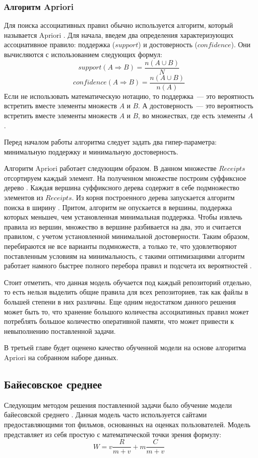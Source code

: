         \subsubsection{Алгоритм Apriori}
Для поиска ассоциативных правил обычно используется алгоритм, который называется Apriori \cite{apriori}. Для начала, введем два определения характеризующих ассоциативное правило: поддержка ($support$) и достоверность ($confidence$). Они вычисляются с использованием следующих формул:
    $$support(A \Rightarrow B) = \frac{n(A \cup B)}{N}$$
    $$confidence(A \Rightarrow B) = \frac{n(A \cup B)}{n(A)}$$
Если не использовать математическую нотацию, то поддержка~--- это вероятность встретить вместе элементы множеств $A$ и $B$. А достоверность~--- это вероятность встретить вместе элементы множеств $A$ и $B$, во множествах, где есть элементы $A$.

Перед началом работы алгоритма следует задать два гипер-параметра: минимальную поддержку и минимальную достоверность. 

Алгоритм Apriori работает следующим образом. В данном множестве $Receipts$ отсортируем каждый элемент. На полученном множестве построим суффиксное дерево \cite{trie}. Каждая вершина суффиксного дерева содержит в себе подмножество элементов из $Receipts$. Из корня построенного дерева запускается алгоритм поиска в ширину \cite{alghorithms}. Притом, алгоритм не опускается в вершины, поддержка которых меньшеч, чем установленная минимальная поддержка. Чтобы извлечь правила из вершин, множество в вершине разбивается на два, это и считается правилом, с учетом установленной минимальной достоверности. Таким образом, перебираются не все варианты подмножеств, а только те, что удовлетворяют поставленным условиям на минимальность, с такими оптимизациями алгоритм работает намного быстрее полного перебора правил и подсчета их вероятностей \cite{apriori}. 

Стоит отметить, что данная модель обучается под каждый репозиторий отдельно, то есть нельзя выделить общие правила для всех репозиториев, так как файлы в большей степени в них различны. Еще одним недостатком данного решения может быть то, что хранение большого количества ассоциативных правил может потреблять большое количество оперативной памяти, что может привести к невыполнению поставленной задачи.

В третьей главе будет оценено качество обученной модели на основе алгоритма Apriori на собранном наборе данных.
    \subsection{Байесовское среднее}\label{chapter-2-bayes}
Следующим методом решения поставленной задачи было обучение модели байесовской среднего \cite{bayesian-average}. Данная модель часто используется сайтами предоставляющими топ фильмов, основанных на оценках пользователей. Модель представляет из себя простую с математической точки зрения формулу:
    \begin{equation}\label{bayes-formula}
        W = v\frac{R}{m + v} + m\frac{C}{m + v}    
    \end{equation}

